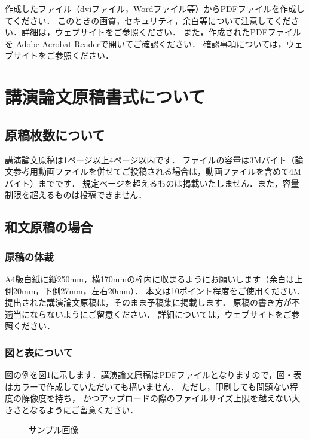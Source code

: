 \documentclass[twocolumn]{jarticle} %
\begin{document}
作成したファイル（dviファイル，Wordファイル等）からPDFファイルを作成してください．
このときの画質，セキュリティ，余白等について注意してください．詳細は，ウェブサイト\cite{website}をご参照ください．
また，作成されたPDFファイルを Adobe Acrobat Readerで開いてご確認ください．
確認事項については，ウェブサイト\cite{website}をご参照ください．

\section{講演論文原稿書式について}
\subsection{原稿枚数について}
講演論文原稿は1ページ以上4ページ以内です．
ファイルの容量は3Mバイト（論文参考用動画ファイルを併せてご投稿される場合は，動画ファイルを含めて4Mバイト）までです．
規定ページを超えるものは掲載いたしません．また，容量制限を超えるものは投稿できません．

\subsection{和文原稿の場合}
\subsubsection{原稿の体裁}
A4版白紙に縦250mm，横170mmの枠内に収まるようにお願いします（余白は上側20mm，下側27mm，左右20mm）．
本文は10ポイント程度をご使用ください．
提出された講演論文原稿は，そのまま予稿集に掲載します．
原稿の書き方が不適当にならないようにご留意ください．
詳細については，ウェブサイト\cite{website}をご参照ください．

\subsubsection{図と表について}
図の例を図\ref{fig:sample}に示します．講演論文原稿はPDFファイルとなりますので，図・表はカラーで作成していただいても構いません．
ただし，印刷しても問題ない程度の解像度を持ち，
かつアップロードの際のファイルサイズ上限を越えない大きさとなるようにご留意ください．

\begin{figure}[tb]
  \centering
  \large
  \caption{サンプル画像}
  \label{fig:sample}
\end{figure}
\end{document}
